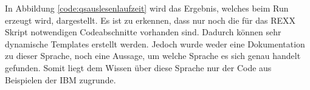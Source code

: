 \begin{minipage}{\linewidth}

\end{minipage}

In Abbildung \ref{code:qsauslesenlaufzeit} wird das Ergebnis, welches beim Run erzeugt wird, dargestellt.
Es ist zu erkennen, dass nur noch die für das REXX Skript notwendigen Codeabschnitte vorhanden sind.
Dadurch können sehr dynamische Templates erstellt werden.
Jedoch wurde weder eine Dokumentation zu dieser Sprache, noch eine Aussage, um welche Sprache es sich genau handelt gefunden.
Somit liegt dem Wissen über diese Sprache nur der Code aus Beispielen der IBM zugrunde.

\begin{minipage}{\linewidth}

\end{minipage}

